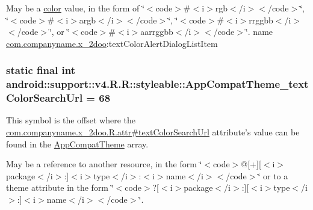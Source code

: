 May be a \hyperlink{classandroid_1_1support_1_1v4_1_1_r_1_1color}{color} value, in the form of \char`\"{}$<$code$>$\#$<$i$>$rgb$<$/i$>$$<$/code$>$\char`\"{}, \char`\"{}$<$code$>$\#$<$i$>$argb$<$/i$>$$<$/code$>$\char`\"{}, \char`\"{}$<$code$>$\#$<$i$>$rrggbb$<$/i$>$$<$/code$>$\char`\"{}, or \char`\"{}$<$code$>$\#$<$i$>$aarrggbb$<$/i$>$$<$/code$>$\char`\"{}.  name \hyperlink{namespacecom_1_1companyname_1_1x__2doo}{com.companyname.x\_\-2doo}:textColorAlertDialogListItem \hypertarget{classandroid_1_1support_1_1v4_1_1_r_1_1styleable_a36f1ef204a6d05d312ba3e930404faa}{
\subsubsection[{AppCompatTheme\_\-textColorSearchUrl}]{\setlength{\rightskip}{0pt plus 5cm}static final int android::support::v4.R.R::styleable::AppCompatTheme\_\-textColorSearchUrl = 68}}
\label{classandroid_1_1support_1_1v4_1_1_r_1_1styleable_a36f1ef204a6d05d312ba3e930404faa}


This symbol is the offset where the \hyperlink{classcom_1_1companyname_1_1x__2doo_1_1_r_1_1attr_30e023e27383c97ab825e2d25f715684}{com.companyname.x\_\-2doo.R.attr\#textColorSearchUrl} attribute's value can be found in the \hyperlink{classandroid_1_1support_1_1v4_1_1_r_1_1styleable_0873e92ba21076bb5a4aeadeb7f5779f}{AppCompatTheme} array.

May be a reference to another resource, in the form \char`\"{}$<$code$>$@\mbox{[}+\mbox{]}\mbox{[}$<$i$>$package$<$/i$>$:\mbox{]}$<$i$>$type$<$/i$>$:$<$i$>$name$<$/i$>$$<$/code$>$\char`\"{} or to a theme attribute in the form \char`\"{}$<$code$>$?\mbox{[}$<$i$>$package$<$/i$>$:\mbox{]}\mbox{[}$<$i$>$type$<$/i$>$:\mbox{]}$<$i$>$name$<$/i$>$$<$/code$>$\char`\"{}. 

